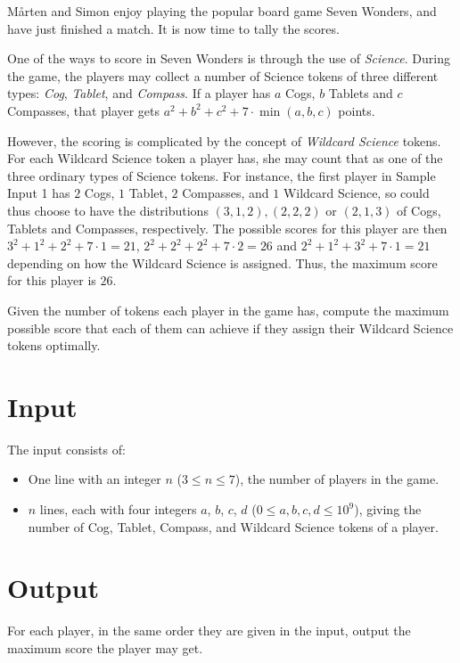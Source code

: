 
%
Mårten and Simon enjoy playing the popular board game Seven Wonders, and have just finished a match. It is now time
to tally the scores.

One of the ways to score in Seven Wonders is through the use of \emph{Science}. During the game, the players
may collect a number of Science tokens of three different types: \emph{Cog}, \emph{Tablet}, and \emph{Compass}.
If a player has $a$ Cogs, $b$ Tablets and $c$ Compasses, that player gets $a^2 + b^2 + c^2 + 7 \cdot \min(a, b, c)$
points.

However, the scoring is complicated by the concept of \emph{Wildcard Science} tokens. For each Wildcard Science token
a player has, she may count that as one of the three ordinary types of Science tokens. For instance, the first player in Sample Input 1 has
$2$ Cogs, $1$ Tablet, $2$ Compasses, and $1$ Wildcard Science, so could thus choose to have the distributions
$(3, 1, 2), (2, 2, 2)$ or $(2, 1, 3)$ of Cogs, Tablets and Compasses, respectively.
The possible scores for this player are then $3^2 + 1^2 + 2^2 + 7 \cdot 1 = 21$, $2^2 + 2^2 + 2^2 + 7 \cdot 2 = 26$
and $2^2 + 1^2 + 3^2 + 7 \cdot 1 = 21$ depending on how the Wildcard Science is assigned.
Thus, the maximum score for this player is $26$.

Given the number of tokens each player in the game has, compute the maximum possible score that each of them
can achieve if they assign their Wildcard Science tokens optimally.



\section*{Input}
The input consists of:
\begin{itemize}
  \item One line with an integer $n$ ($3 \le n \le 7$), the number of players in the game.
  \item $n$ lines, each with four integers $a$, $b$, $c$, $d$
        ($0 \le a, b, c, d \le 10^9$), giving the number of Cog, Tablet, Compass, and Wildcard Science tokens of a player.
\end{itemize}

\section*{Output}
For each player, in the same order they are given in the input, output the maximum score the player may get.
